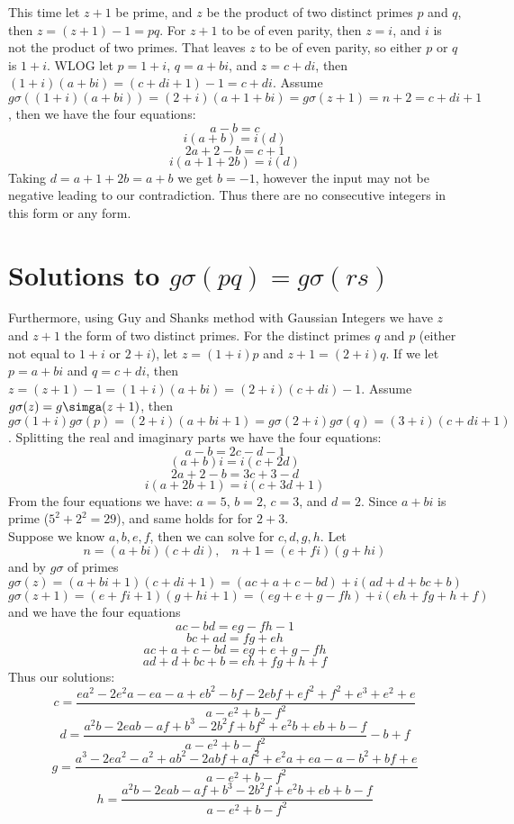 \documentclass[12pt]{amsart}
\begin{document}
This time let $z+1$ be prime, and $z$ be the product of two distinct primes $p$ and $q$, then $z = (z+1) -1 = pq$. For $z+1$ to be of even parity, then $z = i$, and $i$ is not the product of two primes. That leaves $z$ to be of even parity, so either $p$ or $q$ is $1+i$. WLOG let $p=1+i$, $q=a+bi$, and $z = c + di$, then $(1+i)(a+bi) = (c + di+1) - 1 = c + di$. Assume $g\sigma((1+i)(a+bi)) = (2+i)(a+1+bi) = g\sigma(z+1) = n + 2 = c + di + 1$, then we have the four equations:
$$a -b = c$$ $$i(a + b) = i(d)$$ $$2a + 2 -b = c + 1$$ $$i(a + 1 + 2b) = i(d)$$ Taking $d = a + 1 + 2b = a + b$ we get $b = -1$, however the input may not be negative leading to our contradiction. Thus there are no consecutive integers in this form or any form.
\\
\section{Solutions to $g\sigma(pq) = g\sigma(rs)$}
Furthermore, using Guy and Shanks method with Gaussian Integers we have $z$ and $z+1$ the form of two distinct primes. For the distinct primes $q$ and $p$ (either not equal to $1+i$ or $2+i$), let $z = (1+i)p$ and $z+1 = (2+i)q$. If we let $p = a+bi$ and $q=c+di$, then $z = (z + 1) - 1 = (1+i)(a+bi) = (2+i)(c+di) - 1$.  Assume $g\sigma(z) = g\simga(z+1)$, then $g\sigma(1+i)g\sigma(p) = (2+i)(a + bi + 1) = g\sigma(2+i)g\sigma(q) = (3+i)(c+di+1)$. Splitting the real and imaginary parts we have the four equations: $$ a -b = 2c - d - 1$$ $$(a + b)i = i(c + 2d)$$ $$2a + 2 -b = 3c + 3 - d$$ $$i(a +2b + 1) = i(c + 3d + 1)$$
From the four equations we have: $a = 5$, $b=2$, $c = 3$, and $d = 2$. Since $a+bi$ is prime ($5^2 + 2^2 = 29$), and same holds for for $2+3$.
\\

Suppose we know $a,b,e,f$, then we can solve for $c,d,g,h$.
Let $$n = (a + bi)(c+di), \; \; \; n+1 = (e + fi)(g + hi)$$ and by $g\sigma$ of primes  $$ g\sigma(z) = (a + bi + 1)(c + di + 1) = (ac + a + c -bd) + i(ad + d + bc + b)$$ $$ g\sigma(z+1) = (e + fi + 1)(g + hi + 1) = (eg + e + g - fh) + i(eh + fg + h + f)$$
and we have the four equations 
$$ac -bd = eg -fh - 1$$ $$bc + ad = fg + eh$$ 
$$ac + a + c -bd = eg + e + g - fh$$ 
$$ad + d + bc + b = eh + fg + h + f$$
Thus our solutions: 
$$c = \frac{ea^2 - 2e^2a -ea -a + eb^2 -bf -2ebf + ef^2 + f^2 + e^3 + e^2 + e} {a-e^2+b-f^2}$$ 
$$d = \frac{a^2b - 2eab -af +b^3 -2b^2f + bf^2 + e^2b + eb + b - f}{a-e^2 + b -f^2} -b + f$$ 
$$g = \frac{a^3 -2ea^2 - a^2 + ab^2 - 2abf + af^2 + e^2a + ea - a -b^2 + bf + e} {a-e^2+b-f^2}$$ 
$$h = \frac{a^2b - 2eab -af + b^3 - 2b^2f + e^2b + eb +b -f} {a-e^2+b-f^2}$$
\end{document}
